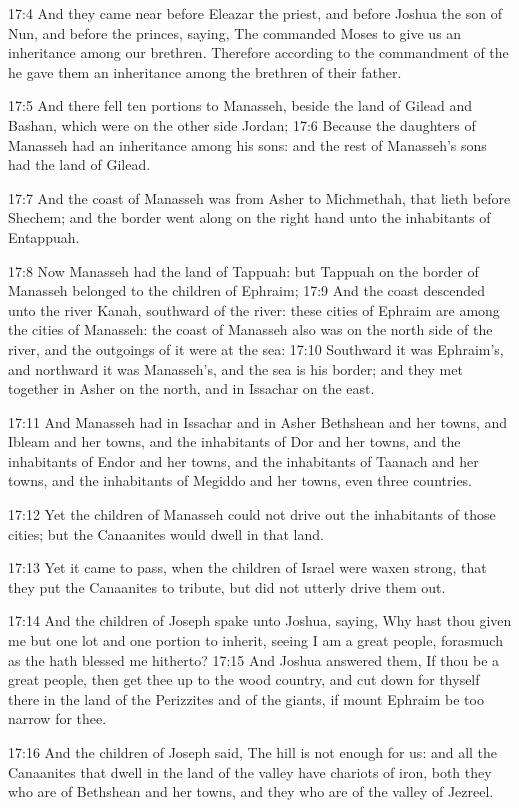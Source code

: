 17:4 And they came near before Eleazar the priest, and before Joshua
the son of Nun, and before the princes, saying, The \LORD commanded
Moses to give us an inheritance among our brethren. Therefore
according to the commandment of the \LORD he gave them an inheritance
among the brethren of their father.

17:5 And there fell ten portions to Manasseh, beside the land of
Gilead and Bashan, which were on the other side Jordan; 17:6 Because
the daughters of Manasseh had an inheritance among his sons: and the
rest of Manasseh's sons had the land of Gilead.

17:7 And the coast of Manasseh was from Asher to Michmethah, that
lieth before Shechem; and the border went along on the right hand unto
the inhabitants of Entappuah.

17:8 Now Manasseh had the land of Tappuah: but Tappuah on the border
of Manasseh belonged to the children of Ephraim; 17:9 And the coast
descended unto the river Kanah, southward of the river: these cities
of Ephraim are among the cities of Manasseh: the coast of Manasseh
also was on the north side of the river, and the outgoings of it were
at the sea: 17:10 Southward it was Ephraim's, and northward it was
Manasseh's, and the sea is his border; and they met together in Asher
on the north, and in Issachar on the east.

17:11 And Manasseh had in Issachar and in Asher Bethshean and her
towns, and Ibleam and her towns, and the inhabitants of Dor and her
towns, and the inhabitants of Endor and her towns, and the inhabitants
of Taanach and her towns, and the inhabitants of Megiddo and her
towns, even three countries.

17:12 Yet the children of Manasseh could not drive out the inhabitants
of those cities; but the Canaanites would dwell in that land.

17:13 Yet it came to pass, when the children of Israel were waxen
strong, that they put the Canaanites to tribute, but did not utterly
drive them out.

17:14 And the children of Joseph spake unto Joshua, saying, Why hast
thou given me but one lot and one portion to inherit, seeing I am a
great people, forasmuch as the \LORD hath blessed me hitherto?  17:15
And Joshua answered them, If thou be a great people, then get thee up
to the wood country, and cut down for thyself there in the land of the
Perizzites and of the giants, if mount Ephraim be too narrow for thee.

17:16 And the children of Joseph said, The hill is not enough for us:
and all the Canaanites that dwell in the land of the valley have
chariots of iron, both they who are of Bethshean and her towns, and
they who are of the valley of Jezreel.

